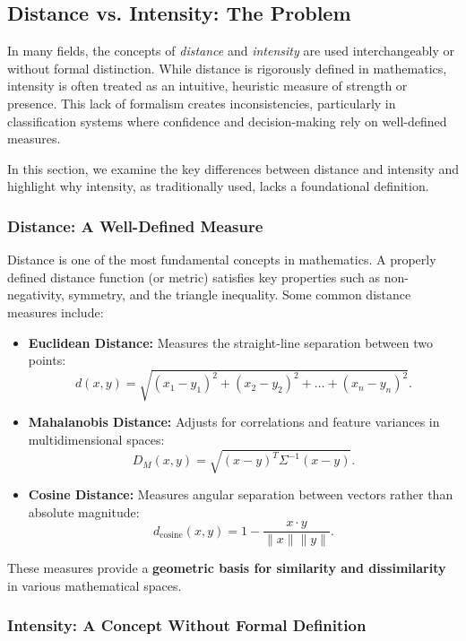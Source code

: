 \subsection{Distance vs. Intensity: The Problem}

In many fields, the concepts of \textit{distance} and \textit{intensity} are used interchangeably or without formal distinction. While distance is rigorously defined in mathematics, intensity is often treated as an intuitive, heuristic measure of strength or presence. This lack of formalism creates inconsistencies, particularly in classification systems where confidence and decision-making rely on well-defined measures.

In this section, we examine the key differences between distance and intensity and highlight why intensity, as traditionally used, lacks a foundational definition.

\subsubsection{Distance: A Well-Defined Measure}

Distance is one of the most fundamental concepts in mathematics. A properly defined distance function (or metric) satisfies key properties such as non-negativity, symmetry, and the triangle inequality. Some common distance measures include:

\begin{itemize}
    \item \textbf{Euclidean Distance:} Measures the straight-line separation between two points:
    \[
    d(x, y) = \sqrt{(x_1 - y_1)^2 + (x_2 - y_2)^2 + \dots + (x_n - y_n)^2}.
    \]
    \item \textbf{Mahalanobis Distance:} Adjusts for correlations and feature variances in multidimensional spaces:
    \[
    D_M(x, y) = \sqrt{(x - y)^T \Sigma^{-1} (x - y)}.
    \]
    \item \textbf{Cosine Distance:} Measures angular separation between vectors rather than absolute magnitude:
    \[
    d_{\text{cosine}}(x, y) = 1 - \frac{x \cdot y}{\|x\| \|y\|}.
    \]
\end{itemize}

These measures provide a \textbf{geometric basis for similarity and dissimilarity} in various mathematical spaces.


\subsubsection{Intensity: A Concept Without Formal Definition}

